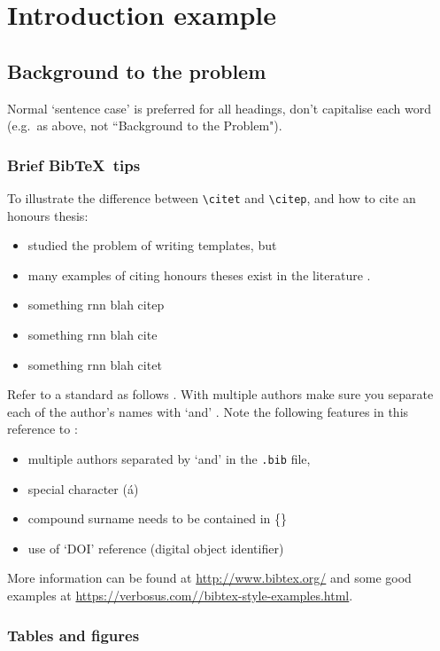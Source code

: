 \chapter{Introduction example}

\section{Background to the problem}

Normal `sentence case' is preferred for all headings, don't capitalise each word (e.g.~as above, not ``Background to the Problem").

\subsection{Brief Bib\TeX\ tips}

To illustrate the difference between \verb|\citet| and \verb|\citep|, and how to cite an honours thesis:
\begin{itemize}
  \item \citet{Marino2016} studied the problem of writing templates, but
  \item many examples of citing honours theses exist in the literature \citep{Marino2016}.
  \item something rnn \citep{Marino2016} blah citep
  \item something rnn \cite{Marino2016} blah cite
  \item something rnn \citet{Marino2016} blah citet
\end{itemize}
Refer to a standard as follows \citep{Marino2016}. With multiple authors make sure you separate each of the author's names with `and' \citep{Marino2016}. Note the following features in this reference to \citet{Marino2016}:
\begin{itemize}
  \item multiple authors separated by `and' in the {\tt .bib} file,
  \item special character (\'a)
  \item compound surname needs to be contained in \{\}
  \item use of `DOI' reference (digital object identifier)  
\end{itemize}

More information can be found at \url{http://www.bibtex.org/} and some good examples at \url{https://verbosus.com//bibtex-style-examples.html}.

\subsection{Tables and figures}


